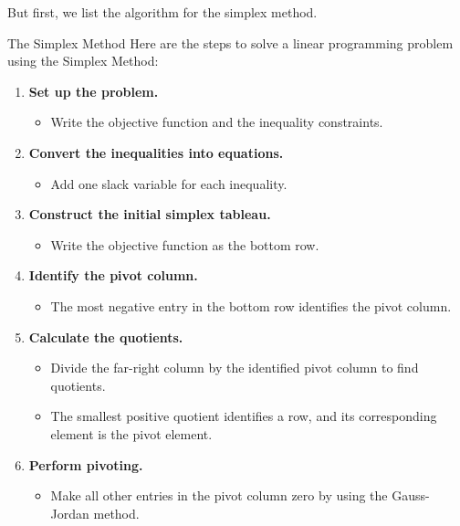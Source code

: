 But first, we list the algorithm for the simplex method.
\begin{summarybox}{The Simplex Method}
    Here are the steps to solve a linear programming problem using the Simplex Method:

    \begin{enumerate}
        \item \textbf{Set up the problem.}
              \begin{itemize}
                  \item Write the objective function and the inequality constraints.
              \end{itemize}

        \item \textbf{Convert the inequalities into equations.}
              \begin{itemize}
                  \item Add one slack variable for each inequality.
              \end{itemize}

        \item \textbf{Construct the initial simplex tableau.}
              \begin{itemize}
                  \item Write the objective function as the bottom row.
              \end{itemize}

        \item \textbf{Identify the pivot column.}
              \begin{itemize}
                  \item The most negative entry in the bottom row identifies the pivot column.
              \end{itemize}

        \item \textbf{Calculate the quotients.}
              \begin{itemize}
                  \item Divide the far-right column by the identified pivot column to find quotients.
                  \item The smallest positive quotient identifies a row, and its corresponding element is the pivot element.
              \end{itemize}

        \item \textbf{Perform pivoting.}
              \begin{itemize}
                  \item Make all other entries in the pivot column zero by using the Gauss-Jordan method.
              \end{itemize}


\end{enumerate}
\end{summarybox}

